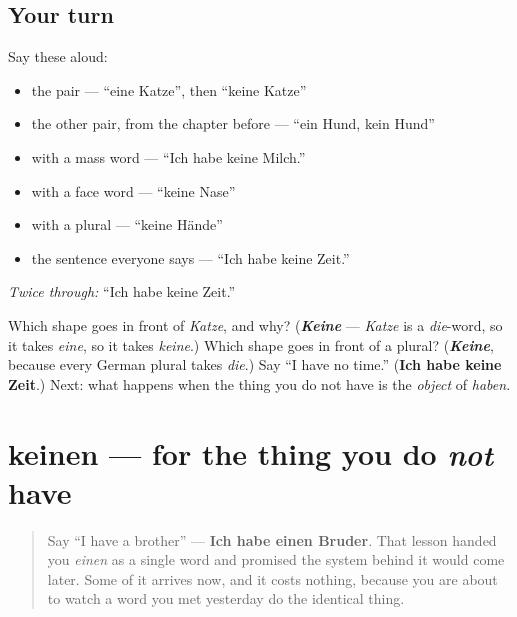 \subsection*{Your turn}
Say these aloud:

\begin{itemize}
\raggedright
  \item the pair — \textquotedblleft{}eine Katze\textquotedblright{}, then \textquotedblleft{}keine Katze\textquotedblright{}
  \item the other pair, from the chapter before — \textquotedblleft{}ein Hund, kein Hund\textquotedblright{}
  \item with a mass word — \textquotedblleft{}Ich habe keine Milch.\textquotedblright{}
  \item with a face word — \textquotedblleft{}keine Nase\textquotedblright{}
  \item with a plural — \textquotedblleft{}keine Hände\textquotedblright{}
  \item the sentence everyone says — \textquotedblleft{}Ich habe keine Zeit.\textquotedblright{}
\end{itemize}

\emph{Twice through:} \textquotedblleft{}Ich habe keine Zeit.\textquotedblright{}

\begin{tcolorbox}[breakable,colback=teal!4,colframe=teal!35!black,title={Before you move on}]
Which shape goes in front of \emph{Katze}, and why? (\emph{\textbf{Keine}} — \emph{Katze} is a \emph{die}-word, so it takes \emph{eine}, so it takes \emph{keine}.) Which shape goes in front of a plural? (\emph{\textbf{Keine}}, because every German plural takes \emph{die}.) Say \textquotedblleft{}I have no time.\textquotedblright{} (\textbf{Ich habe keine Zeit}.) Next: what happens when the thing you do not have is the \emph{object} of \emph{haben}.
\end{tcolorbox}
\section[keinen]{keinen — for the thing you do \emph{not} have}

\label{lesson:GE-C32-keinen}



\begin{quote}
Say \textquotedblleft{}I have a brother\textquotedblright{} — \textbf{Ich habe einen Bruder}. That lesson handed you \emph{einen} as a single word and promised the system behind it would come later. Some of it arrives now, and it costs nothing, because you are about to watch a word you met yesterday do the identical thing.
\end{quote}

